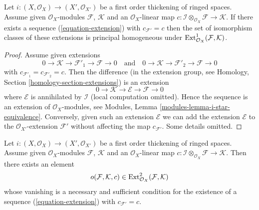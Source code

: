 \begin{lemma}
\label{lemma-inf-ext}
Let $i : (X, \mathcal{O}_X) \to (X', \mathcal{O}_{X'})$ be a first order
thickening of ringed spaces.
Assume given $\mathcal{O}_X$-modules $\mathcal{F}$, $\mathcal{K}$
and an $\mathcal{O}_X$-linear map
$c : \mathcal{I} \otimes_{\mathcal{O}_X} \mathcal{F} \to \mathcal{K}$.
If there exists a sequence (\ref{equation-extension}) with
$c_{\mathcal{F}'} = c$ then the set of isomorphism classes of these
extensions is principal homogeneous under
$\mathop{\mathrm{Ext}}\nolimits^1_{\mathcal{O}_X}(\mathcal{F}, \mathcal{K})$.
\end{lemma}

\begin{proof}
Assume given extensions
$$
0 \to \mathcal{K} \to \mathcal{F}'_1 \to \mathcal{F} \to 0
\quad\text{and}\quad
0 \to \mathcal{K} \to \mathcal{F}'_2 \to \mathcal{F} \to 0
$$
with $c_{\mathcal{F}'_1} = c_{\mathcal{F}'_2} = c$. Then the difference
(in the extension group, see
Homology, Section \ref{homology-section-extensions})
is an extension
$$
0 \to \mathcal{K} \to \mathcal{E} \to \mathcal{F} \to 0
$$
where $\mathcal{E}$ is annihilated by $\mathcal{I}$ (local computation
omitted). Hence the sequence is an extension of $\mathcal{O}_X$-modules,
see Modules, Lemma \ref{modules-lemma-i-star-equivalence}.
Conversely, given such an extension $\mathcal{E}$ we can add the extension
$\mathcal{E}$ to the $\mathcal{O}_{X'}$-extension $\mathcal{F}'$ without
affecting the map $c_{\mathcal{F}'}$. Some details omitted.
\end{proof}

\begin{lemma}
\label{lemma-inf-obs-ext}
Let $i : (X, \mathcal{O}_X) \to (X', \mathcal{O}_{X'})$
be a first order thickening of ringed spaces. Assume given
$\mathcal{O}_X$-modules $\mathcal{F}$, $\mathcal{K}$
and an $\mathcal{O}_X$-linear map
$c : \mathcal{I} \otimes_{\mathcal{O}_X} \mathcal{F} \to \mathcal{K}$.
Then there exists an element
$$
o(\mathcal{F}, \mathcal{K}, c) \in
\mathop{\mathrm{Ext}}\nolimits^2_{\mathcal{O}_X}(\mathcal{F}, \mathcal{K})
$$
whose vanishing is a necessary and sufficient condition for the existence
of a sequence (\ref{equation-extension}) with $c_{\mathcal{F}'} = c$.
\end{lemma}

